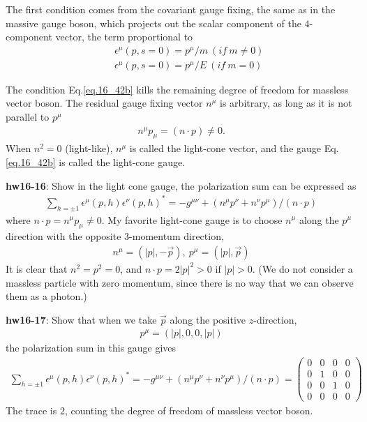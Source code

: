 \documentclass[12pt]{article}
\def\eps{\epsilon}
\begin{document}
The first condition comes from the covariant gauge fixing, the same as
in the massive gauge boson, which projects out the scalar component
of the $4$-component vector, the term proportional to
\begin{eqnarray}
&& \eps^\mu(p,s=0) = p^\mu/m~  (if~ m \neq 0) \label{eq.16_43a}\\ 
&& \eps^\mu(p,s=0) = p^\mu/E ~ (if~ m = 0   ) \label{eq.16_43b}
\end{eqnarray}

The condition Eq.\ref{eq.16_42b} kills the remaining degree of freedom for
massless vector boson. The residual gauge fixing vector $n^\mu$
is arbitrary, as long as it is not parallel to $p^\mu$
\begin{eqnarray}
  n^\mu p_\mu = (n\cdot p) \neq 0. \label{eq.16_44}
\end{eqnarray}
When $n^2 = 0$ (light-like), $n^\mu$ is called the light-cone vector,
and the gauge Eq.\ref{eq.16_42b} is called the light-cone gauge.

{\bf hw16-16}: Show in the light cone gauge, the polarization sum can be
expressed as
\begin{eqnarray}
  \sum_{h=\pm 1} \eps^\mu(p,h) \eps^\nu(p,h)^*
    = -g^{\mu\nu} + (n^\mu p^\nu + n^\nu p^\mu)/(n\cdot p) \label{eq.16_45}
\end{eqnarray}
where $n\cdot p = n^\mu p_\mu \neq 0$.
My favorite light-cone gauge is to choose $n^\mu$ along the $p^\mu$
direction with the opposite $3$-momentum direction,
\begin{eqnarray}
  n^\mu = (|p|, -{\vec p}), ~p^\mu = (|p|, {\vec p}) \label{eq.16_46}
\end{eqnarray}
It is clear that $n^2 = p^2 = 0$, and $n\cdot p = 2|p|^2 > 0$ if $|p| > 0$.
(We do not consider a massless particle with zero momentum, since
there is no way that we can observe them as a photon.)

{\bf hw16-17}: Show that when we take ${\vec p}$ along the positive $z$-direction,
\begin{eqnarray}
  p^\mu = (|p|, 0, 0, |p|) \label{eq.16_47}
\end{eqnarray}
the polarization sum in this gauge gives
\begin{eqnarray}
  \sum_{h=\pm1} \eps^\mu(p,h) \eps^\nu(p,h)^*
    = -g^{\mu\nu} + (n^\mu p^\nu + n^\nu p^\mu)/(n\cdot p) =
    \begin{pmatrix}
      0 & 0 & 0 & 0 \\
      0 & 1 & 0 & 0 \\
      0 & 0 & 1 & 0 \\
      0 & 0 & 0 & 0
    \end{pmatrix} \label{eq.16_48}
\end{eqnarray}
The trace is $2$, counting the degree of freedom of massless vector boson.
\end{document}
